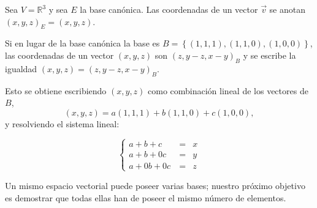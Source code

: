\begin{example}


Sea $V=\mathbb{R}^{3}$    y sea $E$  la base canónica. Las coordenadas de un vector $\Vec{v}$ se anotan  $(x,y,z)_E=(x,y,z)$.


Si en lugar de la base canónica la base es $B=\left\{(1,1,1),(1,1,0),(1,0,0) \right\}$,  las coordenadas  de  un vector $(x,y,z)$  son $(z,y-z,x-y)_B$ y se escribe la igualdad $(x,y,z)=(z,y-z,x-y)_B$.

Esto se obtiene escribiendo  $(x,y,z)$ como combinación lineal de los vectores de $B$, $$(x,y,z)=a(1,1,1)+b(1,1,0)+c(1,0,0),$$ y  resolviendo el sistema lineal:

\begin{equation} 
\left\{ \begin{array} {ccl} \nonumber
                    a + b + c &\ =&x     \\
                     a + b + 0c &\ = &y  \\
                    a +0b +0c  &\ =&z \label{ejemplosist}
                   \end{array}
           \right.
\end{equation}


\end{example}



\bigskip

Un mismo espacio vectorial puede poseer varias bases; nuestro próximo objetivo es demostrar que todas ellas han de poseer el mismo número de elementos.

\bigskip

